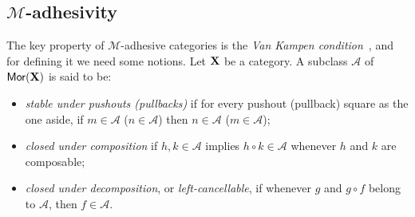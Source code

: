 \documentclass[3p]{elsarticle}
\def\X{\textbf {\textup{X}}}
\newcommand{\mor}{\mathsf{Mor}}
\theoremstyle{remark}
\theoremstyle{definition}
\begin{document}
\subsection{$\mathcal{M}$-adhesivity}\label{subsec:ade}
The key property of $\mathcal{M}$-adhesive categories is the \emph{Van Kampen condition}~\cite{brown1997van,johnstone2007quasitoposes,lack2005adhesive},
%
and for defining it we need some notions.
Let  $\X$ be a category. A subclass $\mathcal{A}$ of $\mor(\X)$ is said to be:

\noindent
\begin{minipage}[l]{.85\linewidth}
	\begin{itemize}
		\item		\emph{stable under pushouts (pullbacks)} if for every pushout (pullback) square as the one aside, if $m \in \mathcal{A}$ ($n\in \mathcal{A}$) then $n \in \mathcal{A}$ ($m \in \mathcal{A}$);
		\item \emph{closed under composition} if $h, k\in \mathcal{A}$ implies $h\circ k\in \mathcal{A}$ whenever $h$ and $k$ are composable;
	\end{itemize}
\end{minipage}\hfill 
\begin{minipage}[r]{.13\linewidth}
\end{minipage}
\begin{itemize}	\item \emph{closed under decomposition}, or \emph{left-cancellable}, if whenever $g$ and $g\circ f$ belong to $\mathcal{A}$, then $f\in \mathcal{A}$.
\end{itemize}
\end{document}

